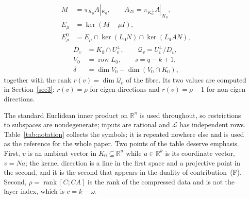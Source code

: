 \documentclass[journal]{IEEEtran}
\theoremstyle{plainn}
\theoremstyle{remark}
\newcommand{\row}{\operatorname{row}}
\newcommand{\rank}{\operatorname{rank}}
\begin{document}
\begin{equation}
  \label{eq:compression}
  \begin{aligned}
    M&=\pi_{K_0}A|_{K_0},\qquad A_{21}=\pi_{K_0^\perp}A|_{K_0},\\
    E_\mu&=\ker(M-\mu I),\\
    E_\mu^0&=E_\mu\cap\ker(L_0N)\cap\ker(L_0AN),
  \end{aligned}
\end{equation}
\begin{equation}
  \label{eq:fibre-data}
  \begin{aligned}
    D_v&=K_0\cap U_v^\perp,\qquad \mathcal Q_v=U_v^\perp/D_v,\\
    V_0&=\row L_0,\qquad s=q-k+1,\\
    \delta&=\dim V_0-\dim(V_0\cap K_0),
  \end{aligned}
\end{equation}
together with the rank $r(v)=\dim\mathcal Q_v$ of the fibre. Its two values are computed in
Section~\ref{sec3}: $r(v)=\rho$ for eigen directions and $r(v)=\rho-1$ for non-eigen
directions.

The standard Euclidean inner product on $\mathbb R^n$ is used throughout, so restrictions to subspaces
are nondegenerate; inputs are rational and $\mathcal L$ has independent rows. Table~\ref{tab:notation}
collects the symbols; it is repeated nowhere else and is used as the reference for the whole paper.
Two points of the table deserve emphasis. First, $v$ is an ambient vector in $K_0\subseteq\mathbb R^n$
while $a\in\mathbb R^k$ is its coordinate vector, $v=Na$; the kernel direction is a line in the first
space and a projective point in the second, and it is the second that appears in the duality of
contribution~(F). Second, $\rho=\rank[C;CA]$ is the rank of the compressed data and is not the layer
index, which is $c=k-\omega$.
\end{document}
